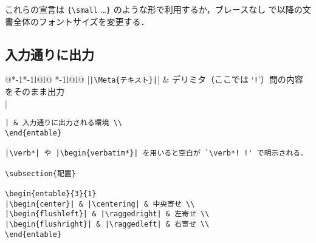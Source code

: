 \documentclass[10pt,a4paper,landscape]{jarticle}
\makeatletter
\def\set@etsep#1#2{\def\etcolsep{#1}\def\etitemsep{#2}}
\newenvironment{entable}[3][\quad\qquad]{\set@etsep#1\relax\relax
  \begin{tabular}{%
    @{}*{\the\numexpr#3-1}{*{\the\numexpr#2-1}{l@{\etcolsep}}l@{\etitemsep}}%
    *{\the\numexpr#2-1}{l@{\etcolsep}}l@{}}}{%
  \end{tabular}}
\newcommand{\Meta}[1]{$\langle$\mbox{}\emph{#1}\mbox{}$\rangle$}
\makeatother
\begin{document}
\egroup

これらの宣言は \verb!{\small! \ldots\verb!}! のような形で利用するか，ブレースなし
で以降の文書全体のフォントサイズを変更する．

\subsection{入力通りに出力}

\begin{entable}[\enspace]{2}{1}
|\verb!|\Meta{テキスト}|!| & デリミタ（ここでは `\texttt{!}'）間の内容をそのまま出力 \\
|\begin{verbatim}| & 入力通りに出力される環境 \\
\end{entable}

|\verb*| や |\begin{verbatim*}| を用いると空白が `\verb*! !' で明示される．

\subsection{配置}

\begin{entable}{3}{1}
|\begin{center}| & |\centering| & 中央寄せ \\
|\begin{flushleft}| & |\raggedright| & 左寄せ \\
|\begin{flushright}| & |\raggedleft| & 右寄せ \\
\end{entable}


\end{verbatim}
\end{entable}
\end{document}
\end{multicols}
\end{document}
